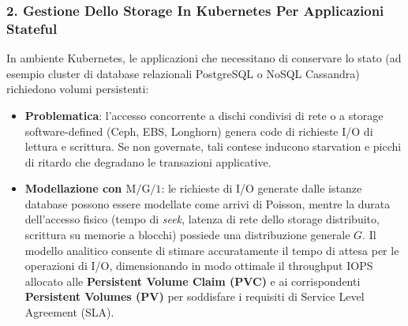 \documentclass[11pt, a4paper]{article}
\begin{document}
\subsubsection{2. Gestione Dello Storage In Kubernetes Per Applicazioni Stateful}

In ambiente Kubernetes, le applicazioni che necessitano di conservare lo stato (ad esempio cluster di database relazionali PostgreSQL o NoSQL Cassandra) richiedono volumi persistenti:
\begin{itemize}[noitemsep]
    \item \textbf{Problematica}: l'accesso concorrente a dischi condivisi di rete o a storage software-defined (Ceph, EBS, Longhorn) genera code di richieste I/O di lettura e scrittura. Se non governate, tali contese inducono starvation e picchi di ritardo che degradano le transazioni applicative.
    \item \textbf{Modellazione con $\text{M/G/1}$}: le richieste di I/O generate dalle istanze database possono essere modellate come arrivi di Poisson, mentre la durata dell'accesso fisico (tempo di \emph{seek}, latenza di rete dello storage distribuito, scrittura su memorie a blocchi) possiede una distribuzione generale $G$. Il modello analitico consente di stimare accuratamente il tempo di attesa per le operazioni di I/O, dimensionando in modo ottimale il throughput IOPS allocato alle \textbf{Persistent Volume Claim (PVC)} e ai corrispondenti \textbf{Persistent Volumes (PV)} per soddisfare i requisiti di Service Level Agreement (SLA).
\end{itemize}
\end{document}
